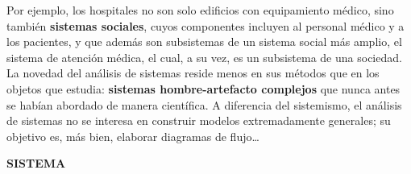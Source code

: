 {Por ejemplo, los hospitales no son solo edificios con equipamiento médico, sino también \textbf{sistemas sociales}, cuyos componentes incluyen al personal médico y a los pacientes, y que además son subsistemas de un sistema social más amplio, el sistema de atención médica, el cual, a su vez, es un subsistema de una sociedad.  
La novedad del análisis de sistemas reside menos en sus métodos que en los objetos que estudia: \textbf{sistemas hombre-artefacto complejos} que nunca antes se habían abordado de manera científica. A diferencia del sistemismo, el análisis de sistemas no se interesa en construir modelos extremadamente generales; su objetivo es, más bien, elaborar diagramas de flujo\ldots
}

\newpage

\fancyhf{}
\fancyhead[r]{\thepage} 
\begin{center}
{\fontsize{16}{18}\selectfont \textbf{SISTEMA}}\\[0.8cm]
\end{center}

\vspace{1cm}


